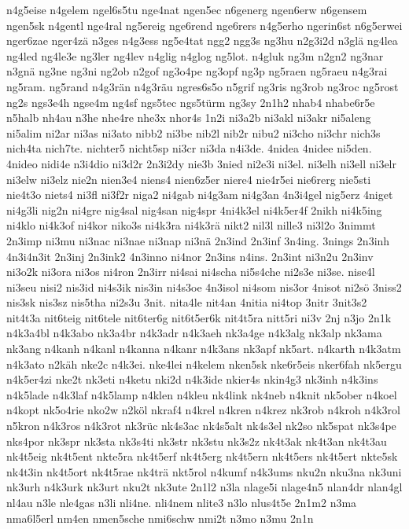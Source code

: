 {n4g5eise
n4gelem
ngel6s5tu
nge4nat
ngen5ec
n6generg
ngen6erw
n6gensem
ngen5sk
n4gentl
nge4ral
ng5ereig
nge6rend
nge6rers
n4g5erho
ngerin6st
n6g5erwei
nger6zae
nger4zä
n3ges
n4g3ess
ng5e4tat
ngg2
ngg3s
ng3hu
n2g3i2d
n3glä
ng4lea
ng4led
ng4le3e
ng3ler
ng4lev
n4glig
n4glog
ng5lot.
n4gluk
ng3m
n2gn2
ng3nar
n3gnä
ng3ne
ng3ni
ng2ob
n2gof
ng3o4pe
ng3opf
ng3p
ng5raen
ng5raeu
n4g3rai
ng5ram.
ng5rand
n4g3rän
n4g3räu
ngres6s5o
n5grif
ng3ris
ng3rob
ng3roc
ng5rost
ng2s
ngs3e4h
ngse4m
ng4sf
ngs5tec
ngs5türm
ng3sy
2n1h2
nhab4
nhabe6r5e
n5halb
nh4au
n3he
nhe4re
nhe3x
nhor4s
1n2i
ni3a2b
ni3akl
ni3akr
ni5aleng
ni5alim
ni2ar
ni3as
ni3ato
nibb2
ni3be
nib2l
nib2r
nibu2
ni3cho
ni3chr
nich3s
nich4ta
nich7te.
nichter5
nicht5sp
ni3cr
ni3da
n4i3de.
4nidea
4nidee
ni5den.
4nideo
nidi4e
n3i4dio
ni3d2r
2n3i2dy
nie3b
3nied
ni2e3i
ni3el.
ni3elh
ni3ell
ni3elr
ni3elw
ni3elz
nie2n
nien3e4
niens4
nien6z5er
niere4
nie4r5ei
nie6rerg
nie5sti
nie4t3o
niets4
ni3fl
ni3f2r
niga2
ni4gab
ni4g3am
ni4g3an
4n3i4gel
nig5erz
4niget
ni4g3li
nig2n
ni4gre
nig4sal
nig4san
nig4spr
4ni4k3el
ni4k5er4f
2nikh
ni4k5ing
ni4klo
ni4k3of
ni4kor
niko3s
ni4k3ra
ni4k3rä
nikt2
nil3l
nille3
ni3l2o
3nimmt
2n3imp
ni3mu
ni3nac
ni3nae
ni3nap
ni3nä
2n3ind
2n3inf
3n4ing.
3nings
2n3inh
4n3i4n3it
2n3inj
2n3ink2
4n3inno
ni4nor
2n3ins
n4ins.
2n3int
ni3n2u
2n3inv
ni3o2k
ni3ora
ni3os
ni4ron
2n3irr
ni4sai
ni4scha
ni5s4che
ni2s3e
ni3se.
nise4l
ni3seu
nisi2
nis3id
ni4s3ik
nis3in
ni4s3oe
4n3isol
ni4som
nis3or
4nisot
ni2sö
3niss2
nis3sk
nis3sz
nis5tha
ni2s3u
3nit.
nita4le
nit4an
4nitia
ni4top
3nitr
3nit3s2
nit4t3a
nit6teig
nit6tele
nit6ter6g
nit6t5er6k
nit4t5ra
nitt5ri
ni3v
2nj
n3jo
2n1k
n4k3a4bl
n4k3abo
nk3a4br
n4k3adr
n4k3aeh
nk3a4ge
n4k3alg
nk3alp
nk3ama
nk3ang
n4kanh
n4kanl
n4kanna
n4kanr
n4k3ans
nk3apf
nk5art.
n4karth
n4k3atm
n4k3ato
n2käh
nke2c
n4k3ei.
nke4lei
n4kelem
nken5sk
nke6r5eis
nker6fah
nk5ergu
n4k5er4zi
nke2t
nk3eti
n4ketu
nki2d
n4k3ide
nkier4s
nkin4g3
nk3inh
n4k3ins
n4k5lade
n4k3laf
n4k5lamp
n4klen
n4kleu
nk4link
nk4neb
n4knit
nk5ober
n4koel
n4kopt
nk5o4rie
nko2w
n2köl
nkraf4
n4krel
n4kren
n4krez
nk3rob
n4kroh
n4k3rol
n5kron
n4k3ros
n4k3rot
nk3rüc
nk4s3ac
nk4s5alt
nk4s3el
nk2so
nk5spat
nk3s4pe
nks4por
nk3spr
nk3sta
nk3s4ti
nk3str
nk3stu
nk3s2z
nk4t3ak
nk4t3an
nk4t3au
nk4t5eig
nk4t5ent
nkte5ra
nk4t5erf
nk4t5erg
nk4t5ern
nk4t5ers
nk4t5ert
nkte5sk
nk4t3in
nk4t5ort
nk4t5rae
nk4trä
nkt5rol
n4kumf
n4k3ums
nku2n
nku3na
nk3uni
nk3urh
n4k3urk
nk3urt
nku2t
nk3ute
2n1l2
n3la
nlage5i
nlage4n5
nlan4dr
nlan4gl
nl4au
n3le
nle4gas
n3li
nli4ne.
nli4nem
nlite3
n3lo
nlus4t5e
2n1m2
n3ma
nma6l5erl
nm4en
nmen5sche
nmi6schw
nmi2t
n3mo
n3mu
2n1n
}
